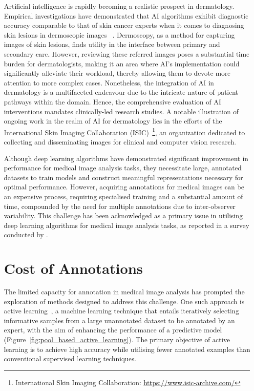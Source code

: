 Artificial intelligence is rapidly becoming a realistic prospect in dermatology. Empirical investigations have demonstrated that AI algorithms exhibit diagnostic accuracy comparable to that of skin cancer experts when it comes to diagnosing skin lesions in dermoscopic images ~\citep{liopyris2022artificial}. Dermoscopy, as a method for capturing images of skin lesions, finds utility in the interface between primary and secondary care. However, reviewing these referred images poses a substantial time burden for dermatologists, making it an area where AI's implementation could significantly alleviate their workload, thereby allowing them to devote more attention to more complex cases. Nonetheless, the integration of AI in dermatology is a multifaceted endeavour due to the intricate nature of patient pathways within the domain. Hence, the comprehensive evaluation of AI interventions mandates clinically-led research studies. A notable illustration of ongoing work in the realm of AI for dermatology lies in the efforts of the International Skin Imaging Collaboration (ISIC)~\footnote{International Skin Imaging Collaboration: \url{https://www.isic-archive.com/}}, an organization dedicated to collecting and disseminating images for clinical and computer vision research.

Although deep learning algorithms have demonstrated significant improvement in performance for medical image analysis tasks, they necessitate large, annotated datasets to train models and construct meaningful representations necessary for optimal performance. However, acquiring annotations for medical images can be an expensive process, requiring specialised training and a substantial amount of time, compounded by the need for multiple annotations due to inter-observer variability. This challenge has been acknowledged as a primary issue in utilising deep learning algorithms for medical image analysis tasks, as reported in a survey conducted by \cite{litjens2017survey}.

\section{Cost of Annotations}
The limited capacity for annotation in medical image analysis has prompted the exploration of methods designed to address this challenge. One such approach is active learning~\citep{settles2009active}, a machine learning technique that entails iteratively selecting informative samples from a large unannotated dataset to be annotated by an expert, with the aim of enhancing the performance of a predictive model (Figure~\ref{fig:pool_based_active_learning}). The primary objective of active learning is to achieve high accuracy while utilising fewer annotated examples than conventional supervised learning techniques.

